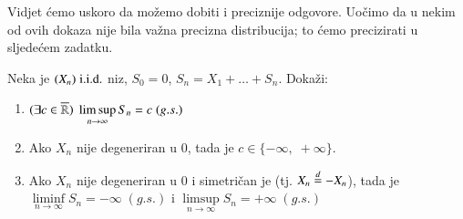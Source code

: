 Vidjet \' cemo uskoro da mo\v zemo dobiti i preciznije odgovore.
Uo\v cimo da u nekim od ovih dokaza nije bila va\v zna precizna distribucija; to \' cemo precizirati u sljede\' cem zadatku.

\begin{zad} \label{zad:10.4}
    Neka je $(X_n) \; \mathrm{i.i.d.}$ niz, $S_0 = 0$, $S_n = X_1 + \ldots + S_n$.
    Doka\v zi:
    \begin{enumerate}[label=(\alph*)]
        \item $(\exists c \in \overline{\mathbb{R}})\; \limsup\limits_{n \to \infty} S_n = c \; (g.s.)$
        \item Ako $X_n$ nije degeneriran u $0$, tada je $c \in \{-\infty, \; +\infty\}$.
        \item Ako $X_n$ nije degeneriran u $0$ i simetri\v can je (tj. $X_n \overset{d}{=} - X_n$), tada je $\liminf\limits_{n \to \infty} S_n = - \infty \; (g.s.)$ i $\limsup\limits_{n \to \infty} S_n = +\infty \; (g.s.)$
    \end{enumerate}
\end{zad}